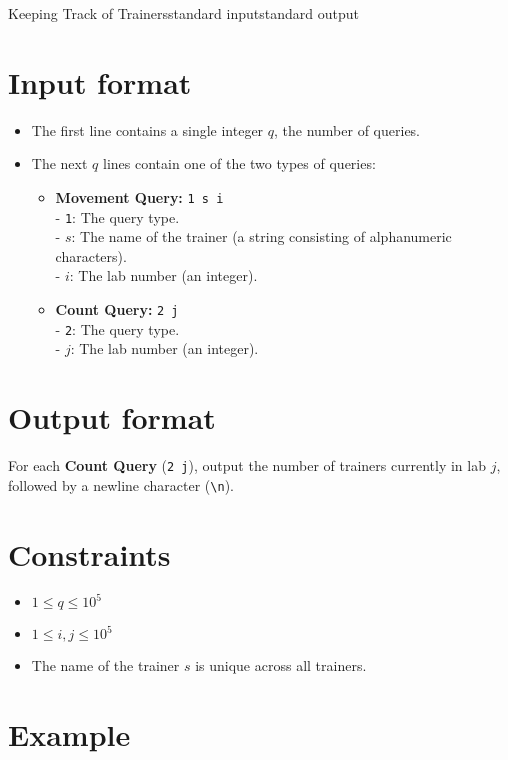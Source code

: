 \begin{problem}{Keeping Track of Trainers}{standard input}{standard output}
    \section*{Input format}
    \begin{itemize}
        \item The first line contains a single integer $q$, the number of queries.
        \item The next $q$ lines contain one of the two types of queries:
        \begin{itemize}
            \item \textbf{Movement Query:} \texttt{1 s i} \\
            - \texttt{1}: The query type. \\
            - $s$: The name of the trainer (a string consisting of alphanumeric characters). \\
            - $i$: The lab number (an integer).
            \item \textbf{Count Query:} \texttt{2 j} \\
            - \texttt{2}: The query type. \\
            - $j$: The lab number (an integer).
        \end{itemize}
    \end{itemize}
    
    \section*{Output format}
    For each \textbf{Count Query} (\texttt{2 j}), output the number of trainers currently in lab $j$, followed by a newline character (\texttt{\textbackslash n}).
    
    \section*{Constraints}
    \begin{itemize}
        \item $1 \leq q \leq 10^5$
        \item $1 \leq i, j \leq 10^5$
        \item The name of the trainer $s$ is unique across all trainers.
    \end{itemize}
    
    \section*{Example}
    \begin{example}
    \end{example}
    

\end{problem}
